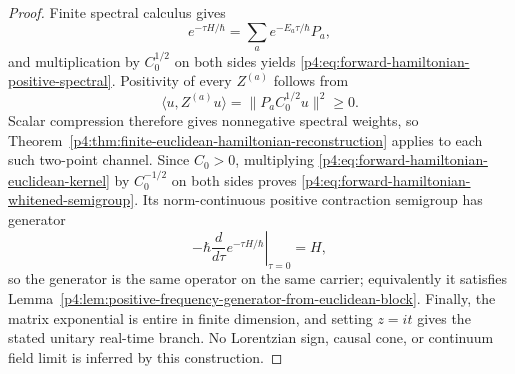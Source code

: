 \documentclass[12pt,a4paper]{article}
\begin{document}
\begin{proof}
Finite spectral calculus gives
\[
 e^{-\tau H/\hbar}=\sum_a e^{-E_a\tau/\hbar}P_a,
\]
and multiplication by \(C_0^{1/2}\) on both sides yields
\eqref{p4:eq:forward-hamiltonian-positive-spectral}.  Positivity of every
\(Z^{(a)}\) follows from
\[
 \langle u,Z^{(a)}u\rangle
 =\|P_aC_0^{1/2}u\|^2\ge0.
\]
Scalar compression therefore gives nonnegative spectral weights, so
Theorem~\ref{p4:thm:finite-euclidean-hamiltonian-reconstruction} applies to
each such two-point channel.  Since \(C_0>0\), multiplying
\eqref{p4:eq:forward-hamiltonian-euclidean-kernel} by \(C_0^{-1/2}\) on both
sides proves \eqref{p4:eq:forward-hamiltonian-whitened-semigroup}.  Its
norm-continuous positive contraction semigroup has generator
\[
 -\hbar\left.\frac{d}{d\tau}e^{-\tau H/\hbar}\right|_{\tau=0}=H,
\]
so the generator is the same operator on the same carrier; equivalently it
satisfies Lemma~\ref{p4:lem:positive-frequency-generator-from-euclidean-block}.
Finally, the matrix exponential is entire in finite dimension, and setting
\(z=it\) gives the stated unitary real-time branch.  No Lorentzian sign,
causal cone, or continuum field limit is inferred by this construction.
\end{proof}
\end{document}
